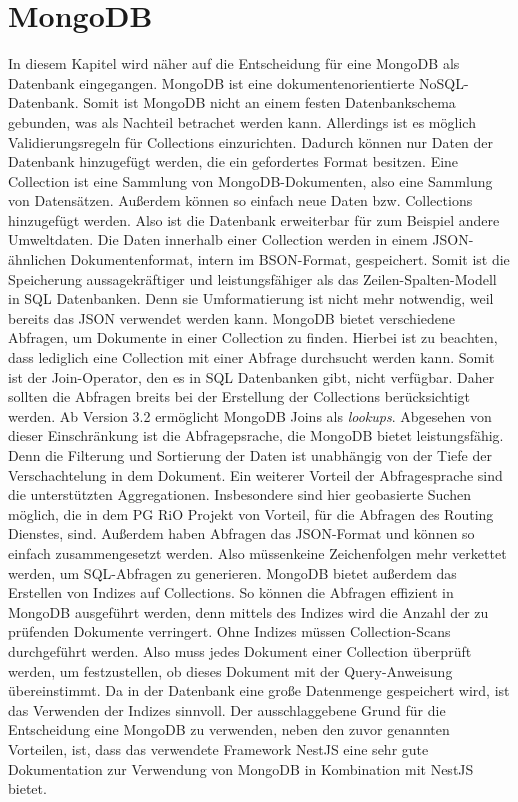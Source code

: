 \section{MongoDB}
\label{sec:grundlagen:datenbank:mongodb}
In diesem Kapitel wird näher auf die Entscheidung für eine MongoDB als Datenbank eingegangen.
MongoDB ist eine dokumentenorientierte NoSQL-Datenbank.
Somit ist MongoDB nicht an einem festen Datenbankschema gebunden, was als Nachteil betrachet werden kann.
Allerdings ist es möglich Validierungsregeln für Collections einzurichten.
Dadurch können nur Daten der Datenbank hinzugefügt werden, die ein gefordertes Format besitzen.
Eine Collection ist eine Sammlung von MongoDB-Dokumenten, also eine Sammlung von Datensätzen\cite{mongodbManual}.
Außerdem können so einfach neue Daten bzw. Collections hinzugefügt werden.
Also ist die Datenbank erweiterbar für zum Beispiel andere Umweltdaten.
Die Daten innerhalb einer Collection werden in einem JSON-ähnlichen Dokumentenformat, intern im BSON-Format, gespeichert.
Somit ist die Speicherung aussagekräftiger und leistungsfähiger als das Zeilen-Spalten-Modell in SQL Datenbanken.
Denn sie Umformatierung ist nicht mehr notwendig, weil bereits das JSON verwendet werden kann\cite{mongodb}.
\newline
MongoDB bietet verschiedene Abfragen, um Dokumente in einer Collection zu finden.
Hierbei ist zu beachten, dass lediglich eine Collection mit einer Abfrage durchsucht werden kann.
Somit ist der Join-Operator, den es in SQL Datenbanken gibt, nicht verfügbar.
Daher sollten die Abfragen breits bei der Erstellung der Collections berücksichtigt werden.
Ab Version 3.2 ermöglicht MongoDB Joins als \textit{lookups}\cite{mongodbJoin}.
Abgesehen von dieser Einschränkung ist die Abfragepsrache, die MongoDB bietet leistungsfähig.
Denn die Filterung und Sortierung der Daten ist unabhängig von der Tiefe der Verschachtelung in dem Dokument.
Ein weiterer Vorteil der Abfragesprache sind die unterstützten Aggregationen.
Insbesondere sind hier geobasierte Suchen möglich, die in dem PG RiO Projekt von Vorteil, für die Abfragen des Routing Dienstes, sind.
Außerdem haben Abfragen das JSON-Format und können so einfach zusammengesetzt werden.
Also müssenkeine Zeichenfolgen mehr verkettet werden, um SQL-Abfragen zu generieren\cite{mongodb}.
\newline
MongoDB bietet außerdem das Erstellen von Indizes auf Collections.
So können die Abfragen effizient in MongoDB ausgeführt werden, denn mittels des Indizes wird die Anzahl der zu prüfenden Dokumente verringert.
Ohne Indizes müssen Collection-Scans durchgeführt werden.
Also muss jedes Dokument einer Collection überprüft werden, um festzustellen, ob dieses Dokument mit der Query-Anweisung übereinstimmt.
Da in der Datenbank eine große Datenmenge gespeichert wird, ist das Verwenden der Indizes sinnvoll\cite{mongodbIndices}.
\newline
Der ausschlaggebene Grund für die Entscheidung eine MongoDB zu verwenden, neben den zuvor genannten Vorteilen, ist, dass das verwendete Framework NestJS eine sehr gute Dokumentation zur Verwendung von MongoDB in Kombination mit NestJS bietet\cite{mongoNest}.